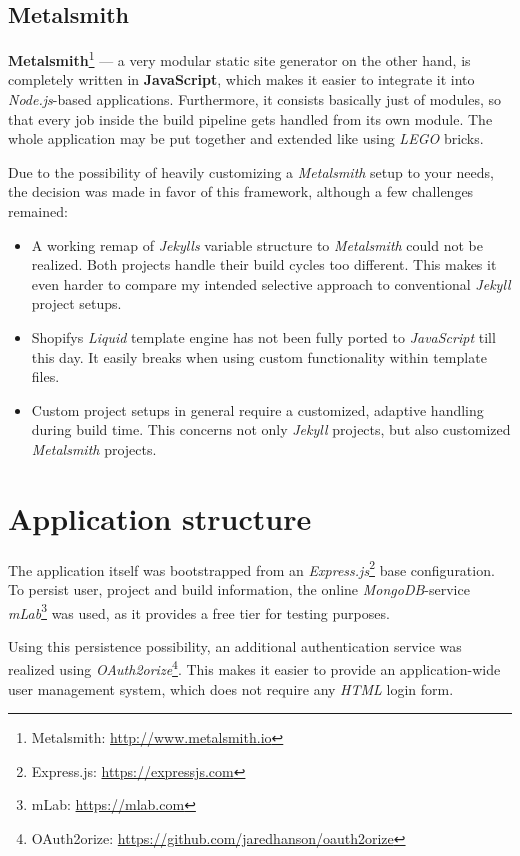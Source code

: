 \documentclass[a4paper,english,11pt]{report}
\begin{document}
\subsection{Metalsmith}
\textbf{Metalsmith}\footnote{Metalsmith: \url{http://www.metalsmith.io}} --- a very modular static site generator on the other hand, is completely written in \textbf{JavaScript}, which makes it easier to integrate it into \emph{Node.js}-based applications. Furthermore, it consists basically just of modules, so that every job inside the build pipeline gets handled from its own module. The whole application may be put together and extended like using \emph{LEGO} bricks.

Due to the possibility of heavily customizing a \emph{Metalsmith} setup to your needs, the decision was made in favor of this framework, although a few challenges remained:

\begin{itemize}
\item A working remap of \emph{Jekyll\textquotesingle s} variable structure to \emph{Metalsmith} could not be realized. Both projects handle their build cycles too different. This makes it even harder to compare my intended selective approach to conventional \emph{Jekyll} project setups.
\item Shopify\textquotesingle s \emph{Liquid} template engine has not been fully ported to \emph{JavaScript} till this day. It easily breaks when using custom functionality within template files.
\item Custom project setups in general require a customized, adaptive handling during build time. This concerns not only \emph{Jekyll} projects, but also customized \emph{Metalsmith} projects.
\end{itemize}

\section{Application structure}
The application itself was bootstrapped from an \emph{Express.js}\footnote{Express.js: \url{https://expressjs.com}} base configuration. To persist user, project and build information, the online \emph{MongoDB}-service \emph{mLab}\footnote{mLab: \url{https://mlab.com}} was used, as it provides a free tier for testing purposes. 

Using this persistence possibility, an additional authentication service was realized using \emph{OAuth2orize}\footnote{OAuth2orize: \url{https://github.com/jaredhanson/oauth2orize}}. This makes it easier to provide an application-wide user management system, which does not require any \emph{HTML} login form.
\end{document}
